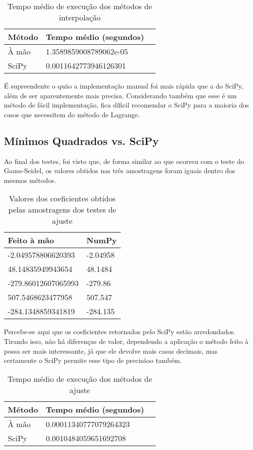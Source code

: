 \documentclass[12pt,A4]{report}
\begin{document}
\begin{table}[htp]
\centering
\begin{tabular}{lll}
Método & Tempo médio (segundos) \\
\hline\hline
À mão  & 1.3589859008789062e-05 \\
SciPy  & 0.0011642773946126301                                              
\end{tabular}
\caption{Tempo médio de execução dos métodos de interpolação}
\end{table}

\newpage
É supreendente o quão a implementação manual foi mais rápida que a do SciPy, além de ser aparentemente mais precisa. Considerando também que esse é um método de fácil implementação, fica díficil recomendar o SciPy para a maioria dos casos que necessitem do método de Lagrange.

\subsection{Mínimos Quadrados vs. SciPy}
Ao final dos testes, foi visto que, de forma similar ao que ocorreu com o teste do Gauss-Seidel, os valores obtidos nas três amostragens foram iguais dentro dos mesmos métodos.
\begin{table}[htp]
\centering
\begin{tabular}{ll}
Feito à mão         & NumPy    \\
\hline\hline
-2.049578806620393  & -2.04958 \\
48.14835949943654   & 48.1484  \\
-279.86012607065993 & -279.86  \\
507.5468623477958   & 507.547  \\
-284.1348859341819  & -284.135
\end{tabular}
\caption{Valores dos coeficientes obtidos pelas amostragens dos testes de ajuste}
\end{table}
Percebe-se aqui que os coeficientes retornados pelo SciPy estão arredondados. Tirando isso, não há diferenças de valor, dependendo a aplicação o método feito à possa ser mais interessante, já que ele devolve mais casas decimais, mas certamente o SciPy permite esse tipo de precisãoo também.

\begin{table}[htp]
\centering
\begin{tabular}{lll}
Método & Tempo médio (segundos) \\
\hline\hline
À mão  & 0.00011340777079264323 \\
SciPy  & 0.0010484059651692708                                             
\end{tabular}
\caption{Tempo médio de execução dos métodos de ajuste}
\end{table}
\end{document}
